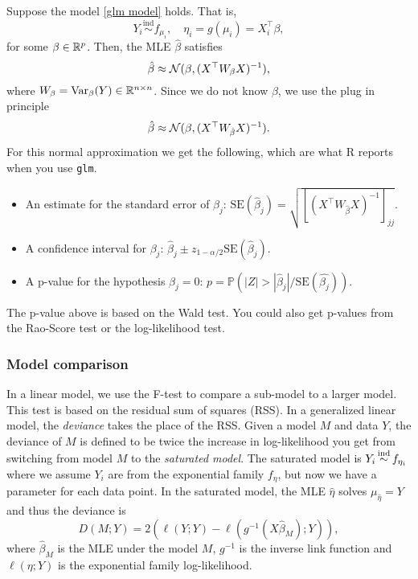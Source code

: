 Suppose the model \eqref{glm model} holds. That is,
\[Y_i \stackrel{\mathrm{ind}}{\sim} f_{\mu_i}, \quad \eta_i=g(\mu_i)= X_i^\top \beta, \]
for some $\beta \in \mathbb{R}^p$. Then, the MLE $\hat{\beta}$ satisfies
\[ \hat{\beta} \approx {\mathcal N}(\beta, (X^\top W_\beta X)^{-1}), \]
where $W_\beta = \mathrm{Var}_\beta(Y) \in \mathbb{R}^{n \times n}$. Since we do not know $\beta$, we use the plug in principle 
\[\hat{\beta} \approx {\mathcal N}(\beta, (X^\top W_{\hat{\beta}} X)^{-1}). \] 
For this normal approximation we get the following, which are what R reports when you use \verb|glm|.
\begin{itemize}
    \item An estimate for the standard error of $\beta_j$: $\mathrm{SE}(\hat{\beta}_j) = \sqrt{\left[(X^\top W_{\hat{\beta}} X)^{-1}\right]_{jj}}$.
    \item A confidence interval for $\beta_j$: $\hat{\beta}_j \pm z_{1-\alpha/2} \mathrm{SE}(\hat{\beta}_j)$.
    \item A p-value for the hypothesis $\beta_j = 0$: $p = \mathbb{P}(|Z| > |\hat{\beta}_j|/\mathrm{SE}(\hat{\beta_j}))$.
\end{itemize}
The p-value above is based on the Wald test. You could also get p-values from the Rao-Score test or the log-likelihood test.


\subsubsection*{Model comparison}

In a linear model, we use the F-test to compare a sub-model to a larger model. This test is based on the residual sum of squares (RSS). In a generalized linear model, the \emph{deviance} takes the place of the RSS. Given a model $M$ and data $Y$, the deviance of $M$ is defined to be twice the increase in log-likelihood you get from switching from model $M$ to the \emph{saturated model}. The saturated model is $Y_i \simind f_{\eta_i}$ where we assume $Y_i$ are from the exponential family $f_\eta$, but now we have a parameter for each data point. In the saturated model, the MLE $\hat{\eta}$ solves $\mu_{\hat{\eta}} = Y$ and thus the deviance is
\[D(M;Y) = 2(\ell(Y;Y) - \ell(g^{-1}(X\hat{\beta}_M);Y)),\]
where $\hat{\beta}_M$ is the MLE under the model $M$, $g^{-1}$ is the inverse link function and $\ell(\eta;Y)$ is the exponential family log-likelihood.

